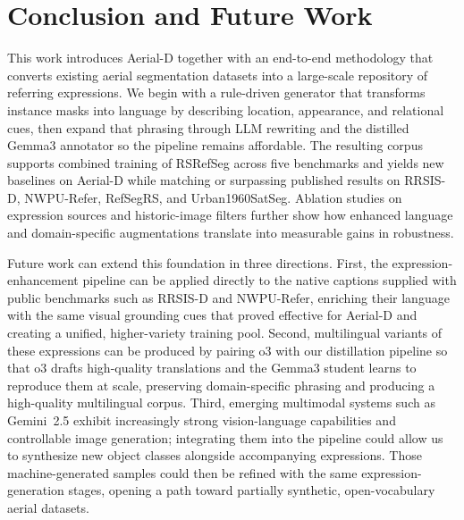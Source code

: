 
\section{Conclusion and Future Work}
\label{sec:conclusion}

This work introduces Aerial\mbox{-}D together with an end-to-end methodology that converts existing aerial segmentation datasets into a large-scale repository of referring expressions. We begin with a rule-driven generator that transforms instance masks into language by describing location, appearance, and relational cues, then expand that phrasing through LLM rewriting and the distilled Gemma3 annotator so the pipeline remains affordable. The resulting corpus supports combined training of RSRefSeg across five benchmarks and yields new baselines on Aerial\mbox{-}D while matching or surpassing published results on RRSIS-D, NWPU-Refer, RefSegRS, and Urban1960SatSeg. Ablation studies on expression sources and historic-image filters further show how enhanced language and domain-specific augmentations translate into measurable gains in robustness.

Future work can extend this foundation in three directions. First, the expression-enhancement pipeline can be applied directly to the native captions supplied with public benchmarks such as RRSIS-D and NWPU-Refer, enriching their language with the same visual grounding cues that proved effective for Aerial\mbox{-}D and creating a unified, higher-variety training pool. Second, multilingual variants of these expressions can be produced by pairing o3 with our distillation pipeline so that o3 drafts high-quality translations and the Gemma3 student learns to reproduce them at scale, preserving domain-specific phrasing and producing a high-quality multilingual corpus. Third, emerging multimodal systems such as Gemini 2.5\cite{gemini25} exhibit increasingly strong vision-language capabilities and controllable image generation; integrating them into the pipeline could allow us to synthesize new object classes alongside accompanying expressions. Those machine-generated samples could then be refined with the same expression-generation stages, opening a path toward partially synthetic, open-vocabulary aerial datasets.
